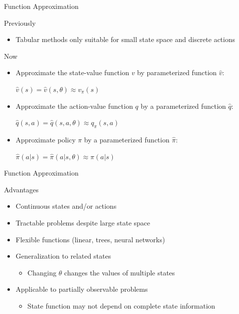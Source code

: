 \documentclass[ignorenonframetext,xcolor=x11names]{beamer}
\begin{document}
\begin{frame}[label=full]{Function Approximation}
\begin{block}{Previously}
\begin{itemize}
\item Tabular methods only suitable for small state space and discrete actions
\end{itemize}
\end{block}

\begin{block}{Now}
\begin{itemize}
\item Approximate the state-value function $v$ by parameterized function $\hat{v}$:\\
\begin{center}
$\hat{v}(s) = \hat{v}(s, \theta) \approx v_{\pi}(s)$ \end{center}
\item Approximate the action-value function $q$ by a parameterized function $\hat{q}$: \\ \vspace{.25\baselineskip}
\begin{center}
$\hat{q}(s, a) = \hat{q}(s, a, \theta) \approx q_{\pi}(s, a)$
\end{center}
\item Approximate policy $\pi$ by a parameterized function $\hat{\pi}$: \\ \vspace{.25\baselineskip}
\begin{center}
$\hat{\pi}(a | s) = \hat{\pi}(a | s, \theta) \approx \pi(a | s)$
\end{center}
\end{itemize}
\end{block}
\end{frame}

\begin{frame}[label=full]{Function Approximation}
\begin{block}{Advantages}
\begin{itemize}
\item Continuous states and/or actions
\item Tractable problems despite large state space
\item Flexible functions (linear, trees, neural networks)
\item Generalization to related states
\begin{itemize}
   \item Changing $\theta$ changes the values of multiple states
\end{itemize}
\item Applicable to partially observable problems
\begin{itemize}
   \item State function may not depend on complete state information
\end{itemize}
\end{itemize}
\end{block}
\end{frame}
\end{document}
